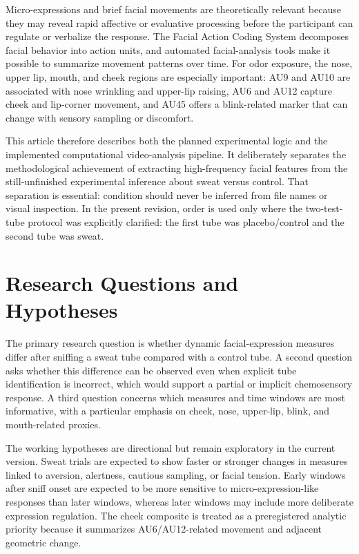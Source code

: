 \documentclass[11pt]{article}
\begin{document}
Micro-expressions and brief facial movements are theoretically relevant because they may reveal rapid affective or evaluative processing before the participant can regulate or verbalize the response. The Facial Action Coding System decomposes facial behavior into action units, and automated facial-analysis tools make it possible to summarize movement patterns over time. For odor exposure, the nose, upper lip, mouth, and cheek regions are especially important: AU9 and AU10 are associated with nose wrinkling and upper-lip raising, AU6 and AU12 capture cheek and lip-corner movement, and AU45 offers a blink-related marker that can change with sensory sampling or discomfort.

This article therefore describes both the planned experimental logic and the implemented computational video-analysis pipeline. It deliberately separates the methodological achievement of extracting high-frequency facial features from the still-unfinished experimental inference about sweat versus control. That separation is essential: condition should never be inferred from file names or visual inspection. In the present revision, order is used only where the two-test-tube protocol was explicitly clarified: the first tube was placebo/control and the second tube was sweat.

\section{Research Questions and Hypotheses}
The primary research question is whether dynamic facial-expression measures differ after sniffing a sweat tube compared with a control tube. A second question asks whether this difference can be observed even when explicit tube identification is incorrect, which would support a partial or implicit chemosensory response. A third question concerns which measures and time windows are most informative, with a particular emphasis on cheek, nose, upper-lip, blink, and mouth-related proxies.

The working hypotheses are directional but remain exploratory in the current version. Sweat trials are expected to show faster or stronger changes in measures linked to aversion, alertness, cautious sampling, or facial tension. Early windows after sniff onset are expected to be more sensitive to micro-expression-like responses than later windows, whereas later windows may include more deliberate expression regulation. The cheek composite is treated as a preregistered analytic priority because it summarizes AU6/AU12-related movement and adjacent geometric change.
\end{document}
